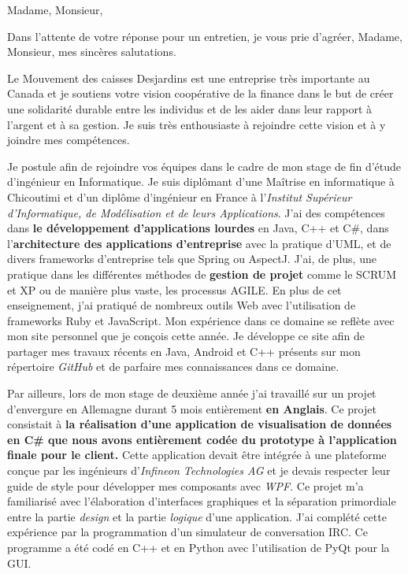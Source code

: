 \date{\today}
\opening{Madame, Monsieur,}
\closing{Dans l'attente de votre réponse pour un entretien, je vous prie d'agréer, Madame, Monsieur, mes sincères salutations.}

\makelettertitle

Le Mouvement des caisses Desjardins est une entreprise très importante au Canada et je soutiens votre vision coopérative de la finance dans le but de créer une solidarité durable entre les individus et de les aider dans leur rapport à l'argent et à sa gestion. Je suis très enthousiaste à rejoindre cette vision et à y joindre mes compétences.

Je postule afin de rejoindre vos équipes dans le cadre de mon stage de fin d'étude d'ingénieur en Informatique. Je suis diplômant d'une Maîtrise en informatique à Chicoutimi et d'un diplôme d'ingénieur en France à l'\textit{Institut Supérieur d'Informatique, de Modélisation et de leurs Applications}. J'ai des compétences dans \textbf{le développement d'applications lourdes} en Java, C++ et C\#, dans l'\textbf{architecture des applications d'entreprise} avec la pratique d'UML, et de divers frameworks d'entreprise tels que Spring ou AspectJ. J'ai, de plus, une pratique dans les différentes méthodes de \textbf{gestion de projet} comme le SCRUM et XP ou de manière plus vaste, les processus AGILE. En plus de cet enseignement, j'ai pratiqué de nombreux outils Web avec l'utilisation de frameworks Ruby et JavaScript. Mon expérience dans ce domaine se reflète avec mon site personnel que je conçois cette année. Je développe ce site afin de partager mes travaux récents en Java, Android et C++ présents sur mon répertoire \textit{GitHub} et de parfaire mes connaissances dans ce domaine.

Par ailleurs, lors de mon stage de deuxième année j'ai travaillé sur un projet d'envergure en Allemagne durant 5 mois entièrement \textbf{en Anglais}. Ce projet consistait à \textbf{la réalisation d'une application de visualisation de données en C\# que nous avons entièrement codée du prototype à l'application finale pour le client.} Cette application devait être intégrée à une plateforme conçue par les ingénieurs d'\textit{Infineon Technologies AG} et je devais respecter leur guide de style pour développer mes composants avec \textit{WPF}. Ce projet m'a familiarisé avec l'élaboration d'interfaces graphiques et la séparation primordiale entre la partie \textit{design} et la partie \textit{logique} d'une application. J'ai complété cette expérience par la programmation d'un simulateur de conversation IRC. Ce programme a été codé en C++ et en Python avec l'utilisation de PyQt pour la GUI. \conclusion{}

\makeletterclosing
